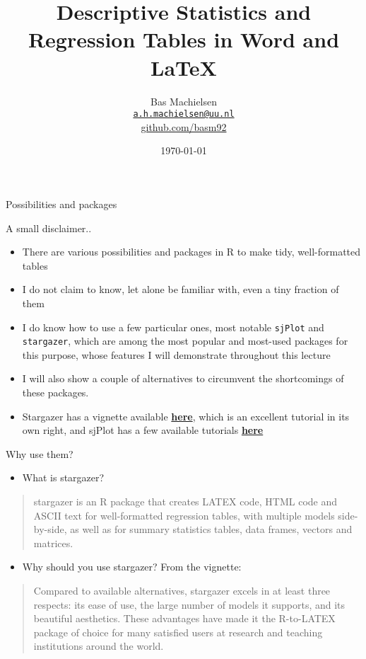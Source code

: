 \documentclass[
  10pt,
  ignorenonframetext,
]{beamer}
\title{Descriptive Statistics and Regression Tables in Word and LaTeX}
\author{Bas Machielsen\\
\href{mailto:a.h.machielsen@uu.nl}{\nolinkurl{a.h.machielsen@uu.nl}}\\
\href{https://github.com/basm92}{github.com/basm92}}
\date{\today}
\institute{Utrecht University - R Cafe}
\providecommand{\tightlist}{%
  \setlength{\itemsep}{0pt}\setlength{\parskip}{0pt}}
\begin{document}
\frame{\titlepage}

\begin{frame}[fragile]{Possibilities and packages}
\protect\hypertarget{possibilities-and-packages}{}

A small disclaimer..

\begin{itemize}
\tightlist
\item
  There are various possibilities and packages in R to make tidy,
  well-formatted tables
\item
  I do not claim to know, let alone be familiar with, even a tiny
  fraction of them
\item
  I do know how to use a few particular ones, most notable
  \texttt{sjPlot} and \texttt{stargazer}, which are among the most
  popular and most-used packages for this purpose, whose features I will
  demonstrate throughout this lecture
\item
  I will also show a couple of alternatives to circumvent the
  shortcomings of these packages.
\item
  Stargazer has a vignette available
  \href{https://cran.r-project.org/web/packages/stargazer/vignettes/stargazer.pdf}{\textbf{here}},
  which is an excellent tutorial in its own right, and sjPlot has a few
  available tutorials
  \href{http://www.strengejacke.de/sjPlot/articles/}{\textbf{here}}
\end{itemize}

\end{frame}

\begin{frame}{Why use them?}
\protect\hypertarget{why-use-them}{}

\begin{itemize}
\tightlist
\item
  What is stargazer?
\end{itemize}

\begin{quote}
stargazer is an R package that creates LATEX code, HTML code and ASCII
text for well-formatted regression tables, with multiple models
side-by-side, as well as for summary statistics tables, data frames,
vectors and matrices.
\end{quote}

\begin{itemize}
\tightlist
\item
  Why should you use stargazer? From the vignette:
\end{itemize}

\begin{quote}
Compared to available alternatives, stargazer excels in at least three
respects: its ease of use, the large number of models it supports, and
its beautiful aesthetics. These advantages have made it the R-to-LATEX
package of choice for many satisfied users at research and teaching
institutions around the world.
\end{quote}

\end{frame}
\end{document}
